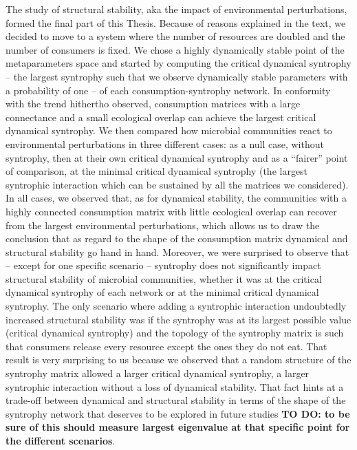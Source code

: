\documentclass[12pt, titlepage]{report}
\begin{document}
The study of structural stability, aka the impact of environmental perturbations, formed the final part of this Thesis. Because of reasons explained in the text, we decided to move to a system where the number of resources are doubled and the number of consumers is fixed. We chose a highly dynamically stable point of the metaparameters space and started by computing the critical dynamical syntrophy -- the largest syntrophy such that we observe dynamically stable parameters with a probability of one -- of each consumption-syntrophy network. In conformity with the trend hithertho observed, consumption matrices with a large connectance and a small ecological overlap can achieve the largest critical dynamical syntrophy. We then compared how microbial communities react to environmental perturbations in three different cases: as a null case, without syntrophy, then at their own critical dynamical syntrophy and as a ``fairer'' point of comparison, at the minimal critical dynamical syntrophy (\ie the largest syntrophic interaction which can be sustained by all the matrices we considered). In all cases, we observed that, as for dynamical stability, the communities with a highly connected consumption matrix with little ecological overlap can recover from the largest environmental perturbations, which allows us to draw the conclusion that as regard to the shape of the consumption matrix dynamical and structural stability go hand in hand. Moreover, we were surprised to observe that -- except for one specific scenario -- syntrophy does not significantly impact structural stability of microbial communities, whether it was at the critical dynamical syntrophy of each network or at the minimal critical dynamical syntrophy. The only scenario where adding a syntrophic interaction undoubtedly increased structural stability was if the syntrophy was at its largest possible value (critical dynamical syntrophy) and the topology of the syntrophy matrix is such that consumers release every resource except the ones they do not eat. That result is very surprising to us because we observed that a random structure of the syntrophy matrix allowed a larger critical dynamical syntrophy, \ie a larger syntrophic interaction without a loss of dynamical stability. That fact hints at a trade-off between dynamical and structural stability in terms of the shape of the syntrophy network that deserves to be explored in future studies \textbf{TO DO: to be sure of this should measure largest eigenvalue at that specific point for the different scenarios}.
\end{document}
